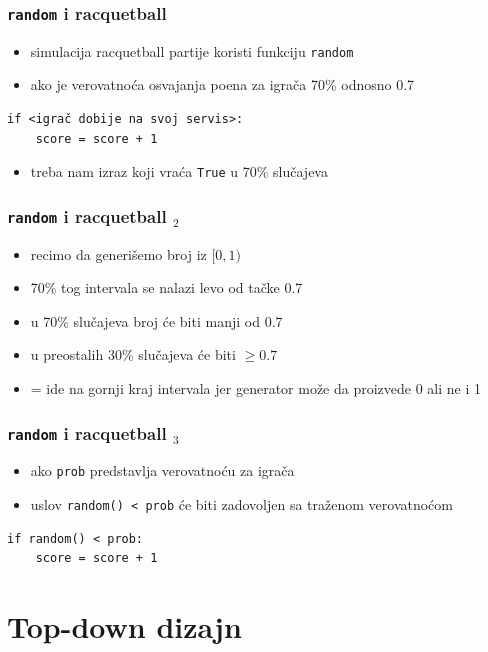 \documentclass[utf8,compress]{beamer}
\begin{document}
\begin{frame}[fragile]
  \frametitle{\texttt{random} i racquetball}
  \begin{itemize}
    \item simulacija racquetball partije koristi funkciju \texttt{random}
    \item ako je verovatnoća osvajanja poena za igrača 70\% odnosno 0.7
  \end{itemize}
\begin{verbatim}
if <igrač dobije na svoj servis>:
    score = score + 1
\end{verbatim}
  \begin{itemize}
    \item treba nam izraz koji vraća \texttt{True} u 70\% slučajeva
  \end{itemize}
\end{frame}

\begin{frame}
  \frametitle{\texttt{random} i racquetball $_2$}
  \begin{itemize}
    \item recimo da generišemo broj iz $[0,1)$
    \item 70\% tog intervala se nalazi levo od tačke 0.7
    \item u 70\% slučajeva broj će biti manji od 0.7
    \item u preostalih 30\% slučajeva će biti $\geq 0.7$
    \item = ide na gornji kraj intervala jer generator može da proizvede 0 ali ne i 1
  \end{itemize}
\end{frame}

\begin{frame}[fragile]
  \frametitle{\texttt{random} i racquetball $_3$}
  \begin{itemize}
    \item ako \texttt{prob} predstavlja verovatnoću za igrača
    \item uslov \texttt{random() < prob} će biti zadovoljen sa traženom verovatnoćom
  \end{itemize}
\begin{verbatim}
if random() < prob:
    score = score + 1
\end{verbatim}
\end{frame}

\section[Top-down]{Top-down dizajn}
\end{document}
